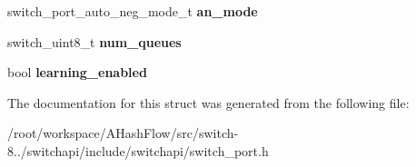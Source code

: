 \begin{DoxyCompactItemize}
\item 
\hypertarget{structswitch__port__attribute__info__s_a52746073903d7c5b84e74358bf3bfc07}{switch\+\_\+port\+\_\+auto\+\_\+neg\+\_\+mode\+\_\+t {\bfseries an\+\_\+mode}}\label{structswitch__port__attribute__info__s_a52746073903d7c5b84e74358bf3bfc07}

\item 
\hypertarget{structswitch__port__attribute__info__s_ab161ae3e8fa846ed128e04197aa2de2f}{switch\+\_\+uint8\+\_\+t {\bfseries num\+\_\+queues}}\label{structswitch__port__attribute__info__s_ab161ae3e8fa846ed128e04197aa2de2f}

\item 
\hypertarget{structswitch__port__attribute__info__s_a248e72d90f849baf084c5d5426e1095b}{bool {\bfseries learning\+\_\+enabled}}\label{structswitch__port__attribute__info__s_a248e72d90f849baf084c5d5426e1095b}

\end{DoxyCompactItemize}


The documentation for this struct was generated from the following file\+:\begin{DoxyCompactItemize}
\item 
/root/workspace/\+A\+Hash\+Flow/src/switch-\/8../switchapi/include/switchapi/switch\+\_\+port.\+h\end{DoxyCompactItemize}
